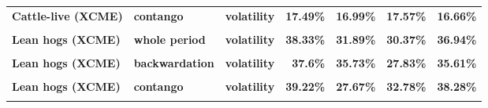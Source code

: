 \documentclass[
  authoryear,
  preprint,
  3p]{elsarticle}
\begin{document}
\begin{longtable}[t]{>{}l>{}l>{}l>{}r>{}r>{}r>{}r}
\textbf{Cattle-live (XCME)} & \textbf{contango} & \textbf{volatility} & \textcolor[HTML]{4285f4}{\textbf{17.49\%}} & \textcolor[HTML]{4285f4}{\textbf{16.99\%}} & \textcolor[HTML]{4285f4}{\textbf{17.57\%}} & \textcolor[HTML]{4285f4}{\textbf{16.66\%}}\\
\textbf{\cellcolor{gray!10}{Lean hogs (XCME)}} & \textbf{\cellcolor{gray!10}{whole period}} & \textbf{\cellcolor{gray!10}{mean}} & \textcolor[HTML]{4285f4}{\textbf{\cellcolor{gray!10}{0.73\%}}} & \textcolor[HTML]{4285f4}{\textbf{\cellcolor{gray!10}{8.4\%}}} & \textcolor[HTML]{4285f4}{\textbf{\cellcolor{gray!10}{12.69\%}}} & \textcolor[HTML]{4285f4}{\textbf{\cellcolor{gray!10}{-1.09\%}}}\\
\textbf{Lean hogs (XCME)} & \textbf{whole period} & \textbf{volatility} & \textcolor[HTML]{4285f4}{\textbf{38.33\%}} & \textcolor[HTML]{4285f4}{\textbf{31.89\%}} & \textcolor[HTML]{4285f4}{\textbf{30.37\%}} & \textcolor[HTML]{4285f4}{\textbf{36.94\%}}\\
\addlinespace
\textbf{\cellcolor{gray!10}{Lean hogs (XCME)}} & \textbf{\cellcolor{gray!10}{backwardation}} & \textbf{\cellcolor{gray!10}{mean}} & \textcolor[HTML]{4285f4}{\textbf{\cellcolor{gray!10}{12.34\%}}} & \textcolor[HTML]{4285f4}{\textbf{\cellcolor{gray!10}{16.3\%}}} & \textcolor[HTML]{4285f4}{\textbf{\cellcolor{gray!10}{18.23\%}}} & \textcolor[HTML]{4285f4}{\textbf{\cellcolor{gray!10}{19.24\%}}}\\
\textbf{Lean hogs (XCME)} & \textbf{backwardation} & \textbf{volatility} & \textcolor[HTML]{4285f4}{\textbf{37.6\%}} & \textcolor[HTML]{4285f4}{\textbf{35.73\%}} & \textcolor[HTML]{4285f4}{\textbf{27.83\%}} & \textcolor[HTML]{4285f4}{\textbf{35.61\%}}\\
\textbf{\cellcolor{gray!10}{Lean hogs (XCME)}} & \textbf{\cellcolor{gray!10}{contango}} & \textbf{\cellcolor{gray!10}{mean}} & \textcolor[HTML]{4285f4}{\textbf{\cellcolor{gray!10}{-10.5\%}}} & \textcolor[HTML]{4285f4}{\textbf{\cellcolor{gray!10}{0.6\%}}} & \textcolor[HTML]{4285f4}{\textbf{\cellcolor{gray!10}{7.5\%}}} & \textcolor[HTML]{4285f4}{\textbf{\cellcolor{gray!10}{-20.66\%}}}\\
\textbf{Lean hogs (XCME)} & \textbf{contango} & \textbf{volatility} & \textcolor[HTML]{4285f4}{\textbf{39.22\%}} & \textcolor[HTML]{4285f4}{\textbf{27.67\%}} & \textcolor[HTML]{4285f4}{\textbf{32.78\%}} & \textcolor[HTML]{4285f4}{\textbf{38.28\%}}\\
\textbf{\cellcolor{gray!10}{Cocoa (IFUS)}} & \textbf{\cellcolor{gray!10}{whole period}} & \textbf{\cellcolor{gray!10}{mean}} & \textcolor[HTML]{4285f4}{\textbf{\cellcolor{gray!10}{3.66\%}}} & \textcolor[HTML]{4285f4}{\textbf{\cellcolor{gray!10}{16.35\%}}} & \textcolor[HTML]{4285f4}{\textbf{\cellcolor{gray!10}{1.39\%}}} & \textcolor[HTML]{4285f4}{\textbf{\cellcolor{gray!10}{3.65\%}}}\\

\end{longtable}
\end{document}
